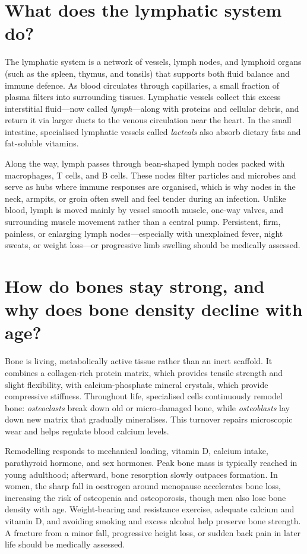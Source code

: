 \documentclass[11pt,oneside]{report}
\begin{document}
\section{What does the lymphatic system do?}

The lymphatic system is a network of vessels, lymph nodes, and lymphoid organs
(such as the spleen, thymus, and tonsils) that supports both fluid balance and
immune defence. As blood circulates through capillaries, a small fraction of
plasma filters into surrounding tissues. Lymphatic vessels collect this excess
interstitial fluid---now called \emph{lymph}---along with proteins and cellular
debris, and return it via larger ducts to the venous circulation near the
heart. In the small intestine, specialised lymphatic vessels called
\emph{lacteals} also absorb dietary fats and fat-soluble vitamins.

Along the way, lymph passes through bean-shaped lymph nodes packed with
macrophages, T cells, and B cells. These nodes filter particles and microbes
and serve as hubs where immune responses are organised, which is why nodes in
the neck, armpits, or groin often swell and feel tender during an infection.
Unlike blood, lymph is moved mainly by vessel smooth muscle, one-way valves,
and surrounding muscle movement rather than a central pump. Persistent, firm,
painless, or enlarging lymph nodes---especially with unexplained fever, night
sweats, or weight loss---or progressive limb swelling should be medically
assessed.

\section{How do bones stay strong, and why does bone density decline with age?}

Bone is living, metabolically active tissue rather than an inert scaffold. It
combines a collagen-rich protein matrix, which provides tensile strength and
slight flexibility, with calcium-phosphate mineral crystals, which provide
compressive stiffness. Throughout life, specialised cells continuously remodel
bone: \emph{osteoclasts} break down old or micro-damaged bone, while
\emph{osteoblasts} lay down new matrix that gradually mineralises. This turnover
repairs microscopic wear and helps regulate blood calcium levels.

Remodelling responds to mechanical loading, vitamin D, calcium intake,
parathyroid hormone, and sex hormones. Peak bone mass is typically reached in
young adulthood; afterward, bone resorption slowly outpaces formation. In women,
the sharp fall in oestrogen around menopause accelerates bone loss, increasing
the risk of osteopenia and osteoporosis, though men also lose bone density
with age. Weight-bearing and resistance exercise, adequate calcium and vitamin
D, and avoiding smoking and excess alcohol help preserve bone strength. A
fracture from a minor fall, progressive height loss, or sudden back pain in
later life should be medically assessed.
\end{document}
